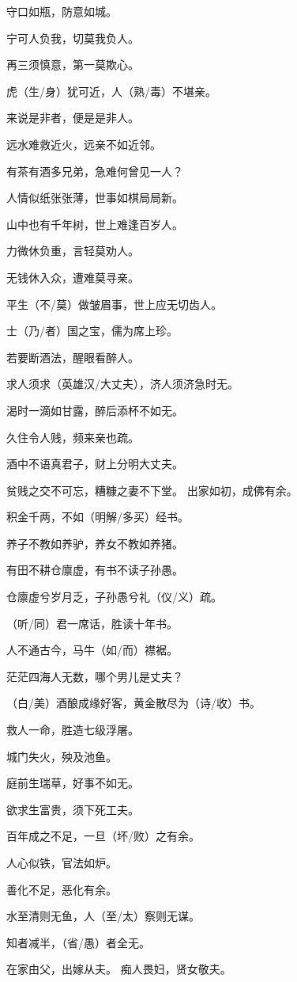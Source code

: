 \documentclass[12pt,UTF8]{ctexbook}
\begin{document}
守口如瓶，防意如城。

宁可人负我，切莫我负人。

再三须慎意，第一莫欺心。

虎（生/身）犹可近，人（熟/毒）不堪亲。

来说是非者，便是是非人。

远水难救近火，远亲不如近邻。

有茶有酒多兄弟，急难何曾见一人？

人情似纸张张薄，世事如棋局局新。

山中也有千年树，世上难逢百岁人。

力微休负重，言轻莫劝人。

无钱休入众，遭难莫寻亲。

平生（不/莫）做皱眉事，世上应无切齿人。

士（乃/者）国之宝，儒为席上珍。

若要断酒法，醒眼看醉人。

求人须求（英雄汉/大丈夫），济人须济急时无。

渴时一滴如甘露，醉后添杯不如无。

久住令人贱，频来亲也疏。

酒中不语真君子，财上分明大丈夫。

贫贱之交不可忘，糟糠之妻不下堂。
出家如初，成佛有余。

积金千两，不如（明解/多买）经书。

养子不教如养驴，养女不教如养猪。

有田不耕仓廪虚，有书不读子孙愚。

仓廪虚兮岁月乏，子孙愚兮礼（仪/义）疏。

（听/同）君一席话，胜读十年书。

人不通古今，马牛（如/而）襟裾。

茫茫四海人无数，哪个男儿是丈夫？

（白/美）酒酿成缘好客，黄金散尽为（诗/收）书。

救人一命，胜造七级浮屠。

城门失火，殃及池鱼。

庭前生瑞草，好事不如无。

欲求生富贵，须下死工夫。

百年成之不足，一旦（坏/败）之有余。

人心似铁，官法如炉。

善化不足，恶化有余。

水至清则无鱼，人（至/太）察则无谋。

知者减半，（省/愚）者全无。

在家由父，出嫁从夫。
痴人畏妇，贤女敬夫。
\end{document}
